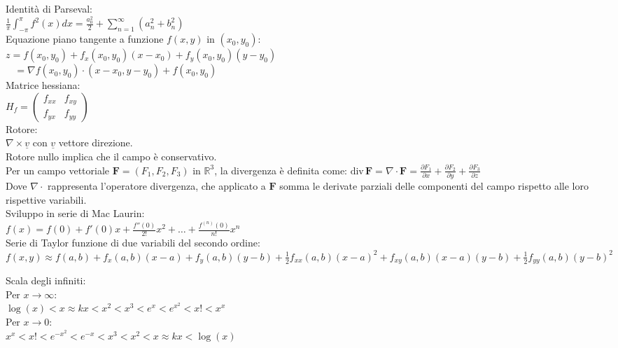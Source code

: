\documentclass[10pt,landscape, a4paper]{article}
\begin{document}
\begin{multicols}{3}
{Identità di Parseval:\\
$\frac{1}{\pi}\int_{-\pi}^{\pi} f^2(x)dx = \frac{a_0^2}{2} + \sum_{n=1}^{\infty} (a_n^2 + b_n^2)$\\

Equazione piano tangente a funzione $f(x,y)$ in $(x_0,y_0)$:\\
$z = f(x_0,y_0) + f_x(x_0,y_0)(x-x_0) + f_y(x_0,y_0)(y-y_0)$\\
$\text{ } \ = \nabla f(x_0,y_0) \cdot (x-x_0,y-y_0) + f(x_0,y_0)$\\

Matrice hessiana:\\
$H_f = \begin{pmatrix}
	f_{xx} & f_{xy}\\
	f_{yx} & f_{yy}
\end{pmatrix}$\\

Rotore:\\
$\nabla \times \underline{v}$ con $\underline{v}$ vettore direzione.\\
Rotore nullo implica che il campo è conservativo.\\

Per un campo vettoriale $ \mathbf{F} = (F_1, F_2, F_3) $ in $ \mathbb{R}^3 $, la divergenza è definita come: $\text{div} \, \mathbf{F} = \nabla \cdot \mathbf{F} = \frac{\partial F_1}{\partial x} + \frac{\partial F_2}{\partial y} + \frac{\partial F_3}{\partial z}$\\
Dove $ \nabla \cdot $ rappresenta l'operatore divergenza, che applicato a $ \mathbf{F} $ somma le derivate parziali delle componenti del campo rispetto alle loro rispettive variabili.\\

Sviluppo in serie di Mac Laurin:\\
$f(x) = f(0) + f'(0)x + \frac{f''(0)}{2!}x^2 + \dots + \frac{f^{(n)}(0)}{n!}x^n$\\

Serie di Taylor funzione di due variabili del secondo ordine:\\
$f(x, y) \approx f(a, b) + f_x(a, b) (x-a) + f_y(a, b) (y-b) + \frac{1}{2} f_{xx}(a, b) (x-a)^2 + f_{xy}(a, b) (x-a)(y-b) + \frac{1}{2} f_{yy}(a, b) (y-b)^2$


Scala degli infiniti:\\
Per $x \to \infty$:\\
$\log(x) < x \approx kx < x^2 < x^3 < e^x < e^{x^2} < x! < x^x$\\
Per $x \to 0$:\\
$x^x < x! < e^{-x^2} < e^{-x} < x^3 < x^2 < x \approx kx < \log(x)$\\

}
\end{multicols}
\end{document}
